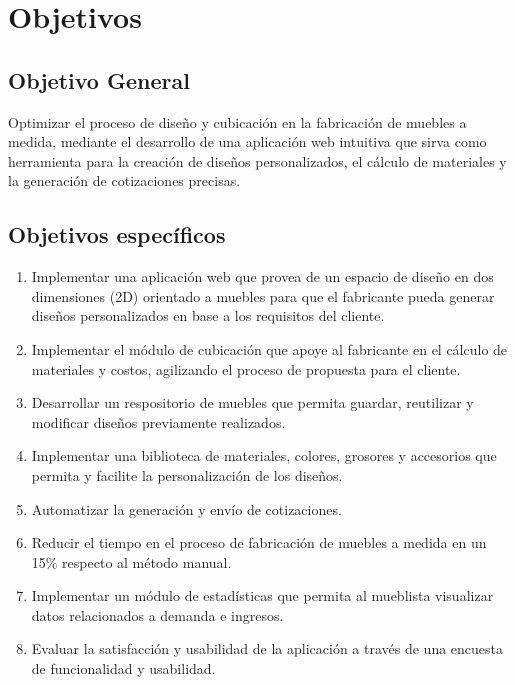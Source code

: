 ﻿\documentclass{iccmemoria}
\begin{document}
\section{Objetivos}
\begingroup
\subsection{Objetivo General}

Optimizar el proceso de diseño y cubicación en la fabricación de muebles a medida, mediante el desarrollo de una aplicación web intuitiva que sirva como herramienta para la creación de diseños personalizados, el cálculo de materiales y la generación de cotizaciones precisas.\\

\subsection{Objetivos específicos}
\begin{enumerate}
\item Implementar una aplicación web que provea de un espacio de diseño en dos dimensiones (2D) orientado a muebles para que el fabricante pueda generar diseños personalizados en base a los requisitos del cliente.

\item Implementar el módulo de cubicación que apoye al fabricante en el cálculo de materiales y costos, agilizando el proceso de propuesta para el cliente. 

\item Desarrollar un respositorio de muebles que permita guardar, reutilizar y modificar diseños previamente realizados.

\item Implementar una biblioteca de materiales, colores, grosores y accesorios que permita y facilite la personalización de los diseños.

\item Automatizar la generación y envío de cotizaciones.

\item Reducir el tiempo en el proceso de fabricación de muebles a medida en un 15\% respecto al método manual.  

\item Implementar un módulo de estadísticas que permita al mueblista visualizar datos relacionados a demanda e ingresos.

\item Evaluar la satisfacción y usabilidad de la aplicación a través de una encuesta de funcionalidad y usabilidad.
\end{enumerate}
\endgroup
\end{document}
